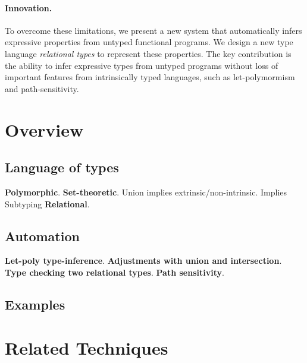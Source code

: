 \documentclass[letterpaper]{llncs}
\begin{document}
\paragraph{Innovation.} 
To overcome these limitations, we present a new system that automatically infers expressive properties 
from untyped functional programs. 
We design a new type language \textit{relational types} to represent these properties.
The key contribution is the ability to infer expressive types from untyped programs
without loss of important features from intrinsically typed languages, such as let-polymormism and path-sensitivity. 
\newline

\section{Overview}

\subsection{Language of types}
\textbf{Polymorphic}.  \newline
\textbf{Set-theoretic}. Union implies extrinsic/non-intrinsic. Implies Subtyping  \newline
\textbf{Relational}.  \newline

\subsection{Automation}
\textbf{Let-poly type-inference}. \newline
\textbf{Adjustments with union and intersection}. \newline
\textbf{Type checking two relational types}. \newline
\textbf{Path sensitivity}. \newline

\subsection{Examples}

\section{Related Techniques}
\end{document}
